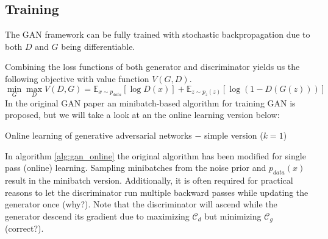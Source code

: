 \subsection{Training}
\label{sub:gan_training}
The GAN framework can be fully trained with stochastic backpropagation due to both $D$ and $G$ being differentiable.

Combining the loss functions of both generator and discriminator yields us the following objective with value function $V(G,D)$.
$$
\min_G \max_D V(D,G) = \mathbb{E}_{x \sim p_{data}}[\log D(x)] + \mathbb{E}_{z \sim p_z(z)}[\log(1 - D(G(z)))]
$$
In the original GAN paper an minibatch-based algorithm for training GAN is proposed, but we will take a look at an the online learning version below:\\
\begin{algorithm}
  \caption{Online learning of generative adversarial networks $-$ simple version ($k=1$)}
  \label{alg:gan_online}
  \begin{algorithmic}[1]
    \EndFor
  \end{algorithmic}
\end{algorithm}

In algorithm \ref{alg:gan_online} the original algorithm has been modified for single pass (online) learning.
Sampling minibatches from the noise prior and $p_{data}(x)$ result in the minibatch version.
Additionally, it is often required for practical reasons to let the discriminator run multiple backward passes while updating the generator once (why?).
Note that the discriminator will ascend while the generator descend its gradient due to maximizing $\mathcal{C}_d$ but minimizing $\mathcal{C}_g$ (correct?).


